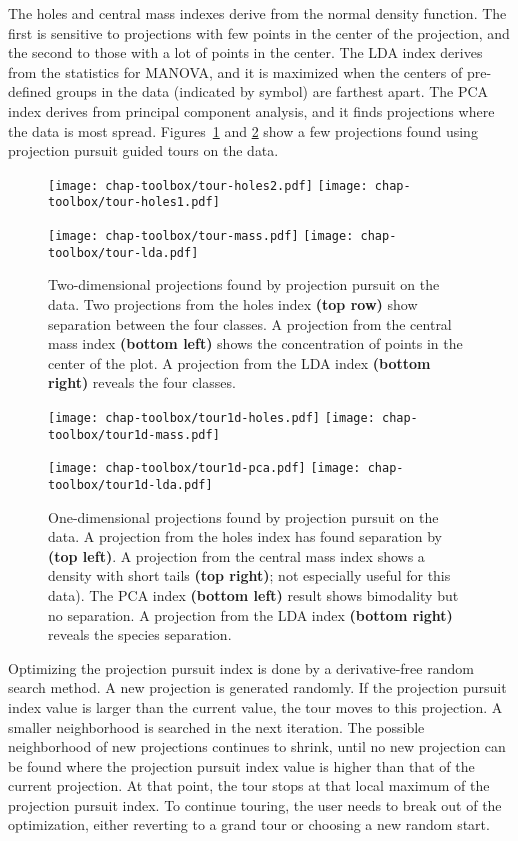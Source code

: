 The holes and central mass indexes \cite{CBC93} derive from the normal
density function. The first is sensitive to projections with few
points in the center of the projection, and the second to those with a
lot of points in the center.  The LDA index \cite{LCKL04} derives from
the statistics for MANOVA, and it is maximized when the centers of
pre-defined groups in the data (indicated by symbol) are farthest
apart. The PCA index derives from principal component analysis, and it
finds projections where the data is most spread. Figures~\ref{pp1} and
\ref{pp2} show a few projections found using projection pursuit guided
tours on the  data.

\begin{figure}[htp]
\centerline{{\texttt{[image: chap-toolbox/tour-holes2.pdf]}}
 {\texttt{[image: chap-toolbox/tour-holes1.pdf]}}}
\smallskip
\centerline{{\texttt{[image: chap-toolbox/tour-mass.pdf]}}
 {\texttt{[image: chap-toolbox/tour-lda.pdf]}}}
\caption[Two-dimensional projections found by projection
pursuit]{Two-dimensional projections found by projection pursuit on
the  data. Two projections from the holes index {\bf (top
row)} show separation between the four classes.  A projection from the
central mass index {\bf (bottom left)} shows the concentration of points
in the center of the plot.  A projection from the LDA index {\bf (bottom
right)} reveals the four classes.}
\label{pp1}
\end{figure}

\begin{figure}[htp]
\centerline{{\texttt{[image: chap-toolbox/tour1d-holes.pdf]}}
 {\texttt{[image: chap-toolbox/tour1d-mass.pdf]}}}
\smallskip
\centerline{{\texttt{[image: chap-toolbox/tour1d-pca.pdf]}}
 {\texttt{[image: chap-toolbox/tour1d-lda.pdf]}}}
\caption[One-dimensional projections found by projection
pursuit]{One-dimensional projections found by projection pursuit on
the  data. A projection from the holes index has found
separation by  {\bf (top left)}.  A projection from the
central mass index shows a density with short tails {\bf (top right)};
not especially useful for this data).  The PCA index {\bf (bottom left)}
result shows bimodality but no separation.  A projection from the LDA
index {\bf (bottom right)} reveals the species separation.  }
\label{pp2}
\end{figure}

Optimizing the projection pursuit index is done by a derivative-free
random search method. A new projection is generated randomly. If the
projection pursuit index value is larger than the current value, the
tour moves to this projection. A smaller neighborhood is searched in
the next iteration. The possible neighborhood of new projections
continues to shrink, until no new projection can be found where the
projection pursuit index value is higher than that of the current
projection.  At that point, the tour stops at that local maximum of
the projection pursuit index. To continue touring, the user needs to
break out of the optimization, either reverting to a grand tour or
choosing a new random start.


